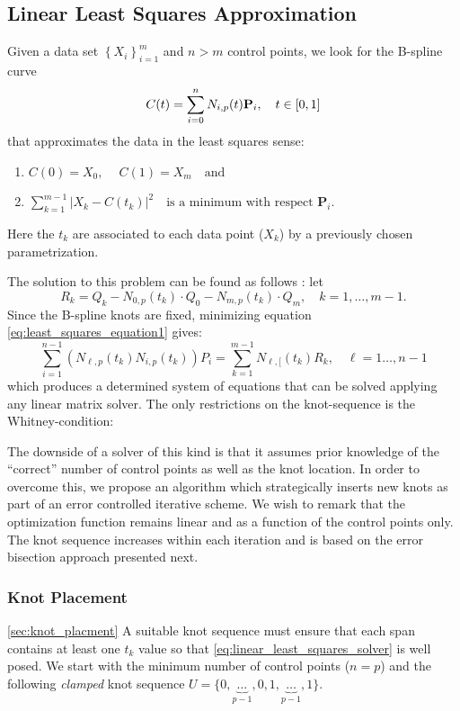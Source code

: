 \subsection{Linear Least Squares Approximation}
Given a data set $\left\{X_i\right\}_{i=1}^m$ and $n>m$ control points, 
we look for the B-spline curve 
\begin{equation}\label{eq:least_squares_equation1}
 C(t) = \sum_{i=0}^n N_{i,p}(t) \textbf P_i,\quad t\in[0,1]
\end{equation}
that approximates the data in the least squares sense:
\begin{enumerate}
 \item $ C(0)= X_0, \quad \  C(1) = X_m\quad \text{and}$
 \item $\sum _{k= 1}^{m-1}\left | X_k - C(t_k)\right|^2\quad \text{is a minimum with respect }\mathbf P_i.$
\end{enumerate}
Here the $t_k$ are associated to each data point ($X_k$) 
by a previously chosen parametrization. 

The solution to this problem can be found as follows \cite[Ch. 9.4.1]{nurbs_book}:
let 
$$
 R_k = Q_k - N_{0,p}(t_k)\cdot Q_0 - N_{m,p}(t_k)\cdot Q_m,  \quad k = 1,\ldots, m-1.
$$
Since the B-spline knots are fixed, minimizing equation \eqref{eq:least_squares_equation1} gives:
\begin{equation}\label{eq:linear_least_squares_solver}
 \sum_{i=1}^{n-1} \left(N_{\ell, p}(t_k)N_{i,p}(t_k)\right)P_i= \sum_{k=1}^{m-1}N_{\ell,[}(t_k)R_k, \quad \ell= 1\ldots, n-1
\end{equation}
 which produces a determined system of equations that can be solved applying
 any linear matrix solver. The only restrictions on the knot-sequence is the Whitney-condition:
 
The downside of a solver of this kind is that 
it assumes prior knowledge of the ``correct'' number of control points as well as the knot 
location. In order to overcome this, we propose an algorithm which strategically inserts new knots as part of an 
error controlled iterative scheme. We wish to remark that the optimization function remains linear and as a 
function of the control points only. The knot sequence increases within each iteration 
and is based on the error bisection approach presented next. 
 
\subsubsection{Knot Placement}\ref{sec:knot_placment}
A suitable knot sequence must ensure that each span contains at least one $t_k$ value so that \eqref{eq:linear_least_squares_solver} is well posed. 
We start with the minimum number of control points ($n = p$) and the following \emph{clamped} knot sequence 
$U=\{0,\underbrace{\ldots}_{p-1},0,1,\underbrace{\ldots}_{p-1},1\}$. 

